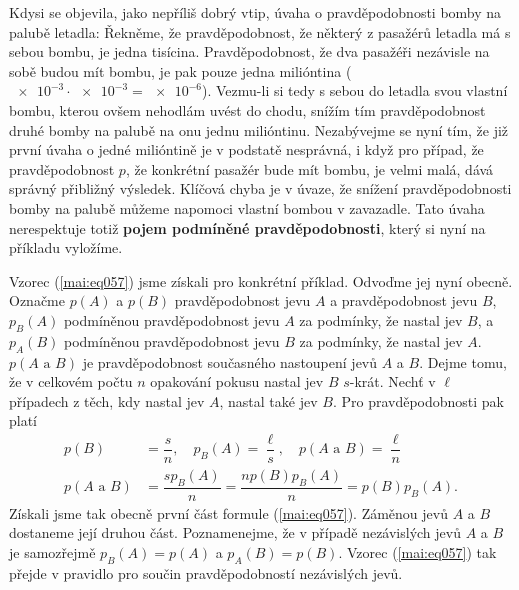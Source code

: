       Kdysi se objevila, jako nepříliš dobrý vtip, úvaha o pravděpodobnosti bomby na palubě letadla:
      Řekněme, že pravděpodobnost, že některý z pasažérů letadla má s sebou bombu, je jedna
      tisícina. Pravděpodobnost, že dva pasažéři nezávisle na sobě budou mít bombu, je pak pouze
      jedna milióntina (\(\num{e-3}\cdot\num{e-3}= \num{e-6}\)). Vezmu-li si tedy s sebou do 
      letadla svou vlastní bombu, kterou ovšem nehodlám uvést do chodu, snížím tím pravděpodobnost 
      druhé bomby na palubě na onu jednu milióntinu. Nezabývejme se nyní tím, že již první úvaha o 
      jedné milióntině je v podstatě nesprávná, i když pro případ, že pravděpodobnost \(p\), že 
      konkrétní pasažér bude mít bombu, je velmi malá, dává správný přibližný výsledek. Klíčová 
      chyba je v úvaze, že snížení pravděpodobnosti bomby na palubě můžeme napomoci vlastní bombou 
      v zavazadle. Tato úvaha nerespektuje totiž \textbf{pojem podmíněné pravděpodobnosti}, který 
      si nyní na příkladu vyložíme.
      
      

      Vzorec (\ref{mai:eq057}) jsme získali pro konkrétní příklad. Odvoďme jej nyní obecně. Označme
      \(p(A)\) a \(p(B)\) pravděpodobnost jevu \(A\) a pravděpodobnost jevu \(B\), \(p_B(A)\)
      podmíněnou pravděpodobnost jevu \(A\) za podmínky, že nastal jev \(B\), a \(p_A(B)\)
      podmíněnou pravděpodobnost jevu \(B\) za podmínky, že nastal jev \(A\). \(p(A\text{ a }B)\) je
      pravděpodobnost současného nastoupení jevů \(A\) a \(B\). Dejme tomu, že v celkovém počtu
      \(n\) opakování pokusu nastal jev \(B\) \(s\)-krát. Nechť v \(\ell\) případech z těch, kdy
      nastal jev \(A\), nastal také jev \(B\). Pro pravděpodobnosti pak platí
      \begin{align*}
        p(B)            &= \dfrac{s}{n}, \quad p_B(A) = \dfrac{\ell}{s}, 
                           \quad p(A\text{ a }B) = \dfrac{\ell}{n}                \\
        p(A\text{ a }B) &= \dfrac{sp_B(A)}{n}    = \dfrac{np(B)p_B(A)}{n} = p(B)p_B(A).
      \end{align*}
      Získali jsme tak obecně první část formule (\ref{mai:eq057}). Záměnou jevů \(A\) a \(B\) 
      dostaneme její druhou část. Poznamenejme, že v případě nezávislých jevů \(A\) a \(B\) je 
      samozřejmě \(p_B(A) = p(A)\) a \(p_A(B) = p(B)\). Vzorec (\ref{mai:eq057}) tak přejde v 
      pravidlo pro součin pravděpodobností nezávislých jevů.
            
